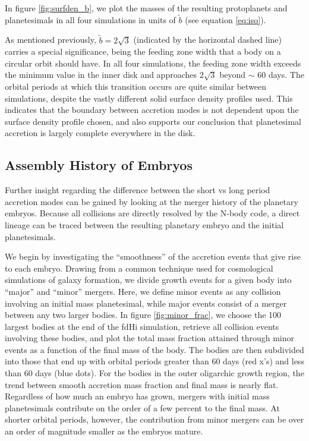 \documentclass[twocolumn]{aastex63}
\begin{document}
In figure \ref{fig:surfden_b}, we plot the masses of the resulting protoplanets and planetesimals in all four simulations in units of $
\tilde{b}$ (see equation \ref{eq:iso}). 

As mentioned previously, $\tilde{b} = 2 \sqrt{3}$ (indicated by the horizontal dashed line) carries a special significance, being the  
feeding zone width that a body on a circular orbit should have. In all four simulations, the feeding zone width exceeds the 
minimum value in the inner disk and approaches $2 \sqrt{3}$ beyond $\sim$ 60 days. The orbital periods at which this transition 
occurs are quite similar between simulations, despite the vastly different solid surface density profiles used. This indicates that 
the boundary between accretion modes is not dependent upon the surface density profile chosen, and also supports our 
conclusion that planetesimal accretion is largely complete everywhere in the disk.

\subsection{Assembly History of Embryos}\label{sec:assembly}

Further insight regarding the difference between the short vs long period accretion modes can be gained by looking at the 
merger history of the planetary embryos. Because all collisions are directly resolved by the N-body code, a direct lineage can be 
traced between the resulting planetary embryo and the initial planetesimals.

We begin by investigating the ``smoothness'' of the accretion events
that give rise to each embryo. Drawing from a common technique used
for cosmological simulations of galaxy formation, we divide growth events for
a given body into ``major'' and ``minor'' mergers. Here, we define minor events as any collision involving an initial mass 
planetesimal, while major events consist of a merger between any two larger bodies. In figure \ref{fig:minor_frac}, we choose the 
100 largest bodies at the end of the fdHi simulation, retrieve all collision events involving these bodies, and plot the total mass 
fraction attained through minor events as a function of the final mass of the body. The bodies are then subdivided into those that 
end up with orbital periods greater than 60 days (red x's) and less than 60 days (blue dots). For the bodies in the outer oligarchic 
growth region, the trend between smooth accretion mass fraction and final mass is nearly flat. Regardless of how much an 
embryo has grown, mergers with initial mass planetesimals contribute on the order of a few percent to the final mass.
At shorter orbital periods, however, the contribution from minor mergers can be over an order of magnitude smaller as the 
embryos mature.
\end{document}
